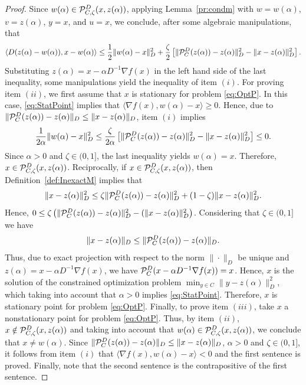 \begin{proof}
	Since $w(\alpha) \in  {\cal P}_{C,\zeta}^{D}(x, z(\alpha))$, applying Lemma~\ref{pr:condm} with   $w=w(\alpha)$, $v=z(\alpha)$, $y=x$,  and $u=x$, we conclude,  after some algebraic manipulations,  that
	$$
		\left\langle D(z(\alpha)-w(\alpha)), x-w(\alpha) \right\rangle \leq 	\frac{1}{2} \|w(\alpha) -x\|_{D}^2 +   \frac{\zeta}{2} \left[\| {\cal P}_{C}^{D}(z(\alpha))-z(\alpha)\|_{D}^2 - \|x-z(\alpha)\|_{D}^2\right].
	$$
	Substituting  $z(\alpha) = x-\alpha D^{-1}\nabla f(x)$ in the left hand side of the last inequality,   some manipulations yield the inequality of item $(i)$.  For proving item $(ii)$, we first assume that $x$ is stationary for problem \eqref{eq:OptP}. In this case, \eqref{eq:StatPoint} implies that $\langle \nabla f(x), w(\alpha)-x \rangle \geq 0$. Hence,  due to $\|{\cal P}_{C}^{D}(z(\alpha))-z(\alpha)\|_{D}\leq  \|x-z(\alpha)\|_{D}$,   item $(i)$ implies
	$$
		\frac{1}{2\alpha} \|w(\alpha) -x\|_{D}^2 \leq    \frac{\zeta}{2\alpha} \left[\| {\cal P}_{C}^{D}(z(\alpha))-z(\alpha)\|_{D}^2 - \|x-z(\alpha)\|_{D}^2\right]\leq 0.
	$$
	Since $\alpha > 0$ and  $\zeta\in (0, 1]$, the last inequality  yields  $w(\alpha) = x$.  Therefore, $x \in {\cal P}_{C,\zeta}^{D}(x, z(\alpha))$. Reciprocally, if  $x \in {\cal P}_{C,\zeta}^{D}(x, z(\alpha))$, then Definition~\ref{def:InexactM} implies that
	$$
		\|x-z(\alpha)\|_{D}^2\leq \zeta \| {\cal P}_{C}^{D}(z(\alpha))-z(\alpha)\|_{D}^2+(1-\zeta)\|x-z(\alpha)\|_{D}^2.
	$$
	Hence, $0\leq \zeta\left( \| {\cal P}_{C}^{D}(z(\alpha))-z(\alpha)\|_{D}^2-(\|x-z(\alpha)\|_{D}^2\right)$. Considering that  $\zeta\in (0, 1]$ we have
	$$
		\|x-z(\alpha)\|_{D}\leq\| {\cal P}_{C}^{D}(z(\alpha))-z(\alpha)\|_{D}.
	$$
	Thus, due to  exact projection  with respect to the norm $\| \cdot \| _{D}$   be unique and $z(\alpha) = x-\alpha D^{-1} \nabla f(x)$,   we have    ${\cal P}_{C}^{D}( x-\alpha D^{-1} \nabla f(x))=x$. Hence, $x$ is the  solution of the constrained optimization problem $  \min _{y\in C}  \|y-z(\alpha)\| ^{2}_{D}$,
	which taking into account that  $\alpha > 0$ implies \eqref{eq:StatPoint}. Therefore, $x$ is stationary point for problem \eqref{eq:OptP}. Finally, to prove item $(iii)$, take $x$ a nonstationary point for problem \eqref{eq:OptP}. Thus, by item $(ii)$, $x \notin  {\cal P}_{C,\zeta}^{D}(x, z(\alpha))$ and taking into account that $w(\alpha) \in  {\cal P}_{C,\zeta}^{D}(x, z(\alpha))$, we conclude that $x \neq w(\alpha)$. Since $\|{\cal P}_{C}^{D}(z(\alpha))-z(\alpha)\|_{D}\leq  \|x-z(\alpha)\|_{D}$, $\alpha > 0$ and $\zeta\in (0, 1]$, it follows from item $(i)$ that $\Big\langle \nabla f(x), w(\alpha) - x \Big\rangle < 0$ and the first sentence is proved. Finally, note that the second sentence is the contrapositive of the first sentence.
\end{proof}

